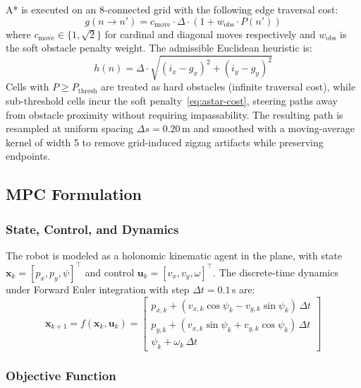 \documentclass[conference]{IEEEtran}
\begin{document}
A* is executed on an 8-connected grid with the following edge traversal cost:
\begin{equation}
	g(n \to n') = c_{\text{move}} \cdot \Delta \cdot \left(1 + w_{\text{obs}} \cdot P(n')\right)
	\label{eq:astar-cost}
\end{equation}
where $c_{\text{move}} \in \{1, \sqrt{2}\}$ for cardinal and diagonal moves respectively and $w_{\text{obs}}$ is the soft obstacle penalty weight. The admissible Euclidean heuristic is:
\begin{equation}
	h(n) = \Delta \cdot \sqrt{(i_x - g_x)^2 + (i_y - g_y)^2}
	\label{eq:heuristic}
\end{equation}
Cells with $P \geq P_{\text{thresh}}$ are treated as hard obstacles (infinite traversal cost), while sub-threshold cells incur the soft penalty~\eqref{eq:astar-cost}, steering paths away from obstacle proximity without requiring impassability. The resulting path is resampled at uniform spacing $\Delta s = 0.20\,\text{m}$ and smoothed with a moving-average kernel of width 5 to remove grid-induced zigzag artifacts while preserving endpoints.

\subsection{MPC Formulation}
\label{sec:mpc}

\subsubsection{State, Control, and Dynamics}

The robot is modeled as a holonomic kinematic agent in the plane, with state $\mathbf{x}_k = [p_x, p_y, \psi]^\top$ and control $\mathbf{u}_k = [v_x, v_y, \omega]^\top$. The discrete-time dynamics under Forward Euler integration with step $\Delta t = 0.1\,\text{s}$ are:
\begin{equation}
	\mathbf{x}_{k+1} = f(\mathbf{x}_k, \mathbf{u}_k) = \begin{bmatrix}
		p_{x,k} + (v_{x,k}\cos\psi_k - v_{y,k}\sin\psi_k)\,\Delta t \\
		p_{y,k} + (v_{x,k}\sin\psi_k + v_{y,k}\cos\psi_k)\,\Delta t \\
		\psi_k + \omega_k\,\Delta t
	\end{bmatrix}
	\label{eq:dynamics}
\end{equation}

\subsubsection{Objective Function}
\end{document}
